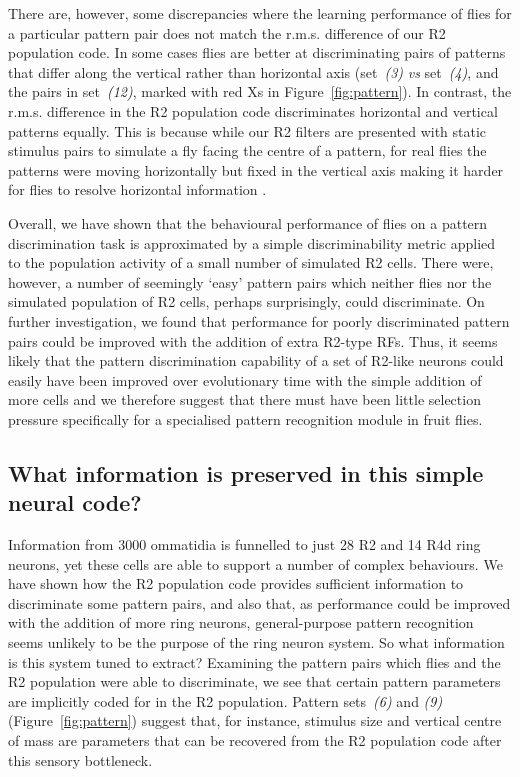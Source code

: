 There are, however, some discrepancies where the learning performance of flies for a particular pattern pair does not match the r.m.s. difference of our R2 population code. In some cases flies are better at discriminating pairs of patterns that differ along the vertical rather than horizontal axis (set~\emph{(3)} \emph{vs} set~\emph{(4)}, and the pairs in set~\emph{(12)}, marked with red Xs in Figure~\ref{fig:pattern}). In contrast, the r.m.s. difference in the R2 population code discriminates horizontal and vertical patterns equally. This is because while our R2 filters are presented with static stimulus pairs to simulate a fly facing the centre of a pattern, for real flies the patterns were moving horizontally but fixed in the vertical axis making it harder for flies to resolve horizontal information \cite{Ernst1999}.

Overall, we have shown that the behavioural performance of flies on a pattern discrimination task is approximated by a simple discriminability metric applied to the population activity of a small number of simulated R2 cells.
There were, however, a number of seemingly `easy' pattern pairs which neither flies nor the simulated population of R2 cells, perhaps surprisingly, could discriminate.
On further investigation, we found that performance for poorly discriminated pattern pairs could be improved with the addition of extra R2-type RFs.
Thus, it seems likely that the pattern discrimination capability of a set of R2-like neurons could easily have been improved over evolutionary time with the simple addition of more cells and we therefore suggest that there must have been little selection pressure specifically for a specialised pattern recognition module in fruit flies.

\begin{comment}
Sig:
above: 8; below: 0; eq: 0; not given: 0; tot: 8
------
NS:
above: 5; below: 13; eq: 0; not given: 1; tot: 19
------
Sig not given:
above: 3; eq: 3; below: 0; not given: 3; tot: 9
------
tot tot: 36
\end{comment}

\subsection*{What information is preserved in this simple neural code?}
Information from 3000 ommatidia is funnelled to just 28 R2 and 14 R4d ring neurons, yet these cells are able to support a number of complex behaviours.
We have shown how the R2 population code provides sufficient information to discriminate some pattern pairs, and also that, as performance could be improved with the addition of more ring neurons, general-purpose pattern recognition seems unlikely to be the purpose of the ring neuron system.
So what information is this system tuned to extract?
Examining the pattern pairs which flies and the R2 population were able to discriminate, we see that certain pattern parameters are implicitly coded for in the R2 population.
Pattern sets~\emph{(6)} and \emph{(9)} (Figure~\ref{fig:pattern}) suggest that, for instance, stimulus size and vertical centre of mass are parameters that can be recovered from the R2 population code after this sensory bottleneck.

